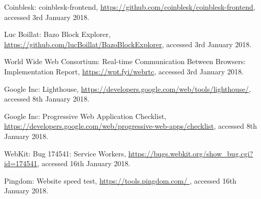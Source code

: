 \begin{thebibliography}{99}
 Coinblesk: coinblesk-frontend, \url{https://github.com/coinblesk/coinblesk-frontend}, accessed 3rd January 2018.

 Luc Boillat: Bazo Block Explorer, \url{https://github.com/lucBoillat/BazoBlockExplorer}, accessed 3rd January 2018.

 World Wide Web Consortium: Real-time Communication Between Browsers: Implementation Report, \url{https://wpt.fyi/webrtc}, accessed 3rd January 2018.

 Google Inc: Lighthouse, \url{https://developers.google.com/web/tools/lighthouse/}, accessed 8th January 2018.

 Google Inc: Progressive Web Application Checklist, \url{https://developers.google.com/web/progressive-web-apps/checklist}, accessed 8th January 2018.

 WebKit: Bug 174541: Service Workers, \url{https://bugs.webkit.org/show_bug.cgi?id=174541}, accessed 16th January 2018.

 Pingdom: Website speed test, \url{https://tools.pingdom.com/
}, accessed 16th January 2018.

\end{thebibliography}


